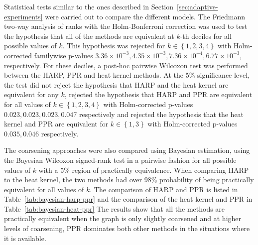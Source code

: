 Statistical tests similar to the ones described in Section~\ref{sec:adaptive-experiments} were carried out to compare the different models. The Friedmann two-way analysis of ranks with the Holm-Bonferroni correction was used to test the hypothesis that all of the methods are equivalent at \( k \)-th deciles for all possible values of \( k \). This hypothesis was rejected for \( k \in \left\{ 1, 2, 3, 4 \right\} \) with Holm-corrected familywise p-values \( 3.36 \times 10^{-3}, 4.35 \times 10^{-3}, 7.36 \times 10^{-4}, 6.77 \times 10^{-3} \), respectively. For these deciles, a post-hoc pairwise Wilcoxon test was performed between the HARP, PPR and heat kernel methods. At the 5\% significance level, the test did not reject the hypothesis that HARP and the heat kernel are equivalent for any \( k \), rejected the hypothesis that HARP and PPR are equivalent for all values of \( k \in \left\{ 1, 2, 3, 4 \right\} \) with Holm-corrected p-values \( 0.023, 0.023, 0.023, 0.047 \) respectively and rejected the hypothesis that the heat kernel and PPR are equivalent for \( k \in \left\{ 1, 3 \right\} \) with Holm-corrected p-values \( 0.035, 0.046 \) respectively.

The coarsening approaches were also compared using Bayesian estimation, using the Bayesian Wilcoxon signed-rank test in a pairwise fashion for all possible values of \( k \) with a 5\% region of practically equivalence. When comparing HARP to the heat kernel, the two methods had over 98\% probability of being practically equivalent for all values of \( k \). The comparison of HARP and PPR is listed in Table~\ref{tab:bayesian-harp-ppr} and the comparison of the heat kernel and PPR in Table~\ref{tab:bayesian-heat-ppr} The results show that all the methods are practically equivalent when the graph is only slightly coarsened and at higher levels of coarsening, PPR dominates both other methods in the situations where it is available.


